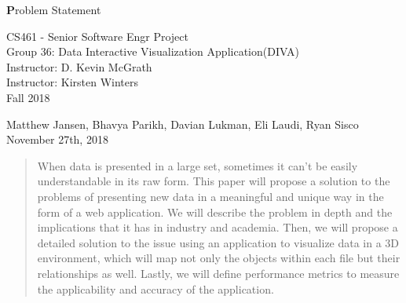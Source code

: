 \documentclass[journal,10pt,onecolumn,compsoc]{IEEEtran} \usepackage[margin=1.0in]{geometry} \usepackage{pdfpages}
\begin{document}
\begin{center}
  
  \textbf{}

  \vspace{2.5cm}
  \Huge{}
  \textbf Problem Statement
  \vspace{1.5cm}

 
  \LARGE
  CS461 - Senior Software Engr Project\\
  \vspace{0.25cm}
  Group 36: Data Interactive Visualization Application(DIVA)\\
  Instructor: D. Kevin McGrath \\
  Instructor: Kirsten Winters \\
  \vspace{0.25cm}
  Fall 2018 \\
  \vspace{1cm}
  
  \large{Matthew Jansen, Bhavya Parikh, Davian Lukman, Eli Laudi, Ryan Sisco}\\
  \vfill
  November 27th, 2018\\
  \vspace{1cm}
  \vspace*{\fill}
   \begin{abstract}
     When data is presented in a large set, sometimes it can't be easily understandable in its raw form. This paper will propose a solution to the problems of presenting new data in a meaningful and unique way in the form of a web application. We will describe the problem in depth and the implications that it has in industry and academia. Then, we will propose a detailed solution to the issue using an application to visualize data in a 3D environment, which will map not only the objects within each file but their relationships as well. Lastly, we will define performance metrics to measure the applicability and accuracy of the application.
       \noindent 
   \end{abstract}
   \normalsize 
  \end{center}
\newpage
\tableofcontents
\newpage
\end{document}
